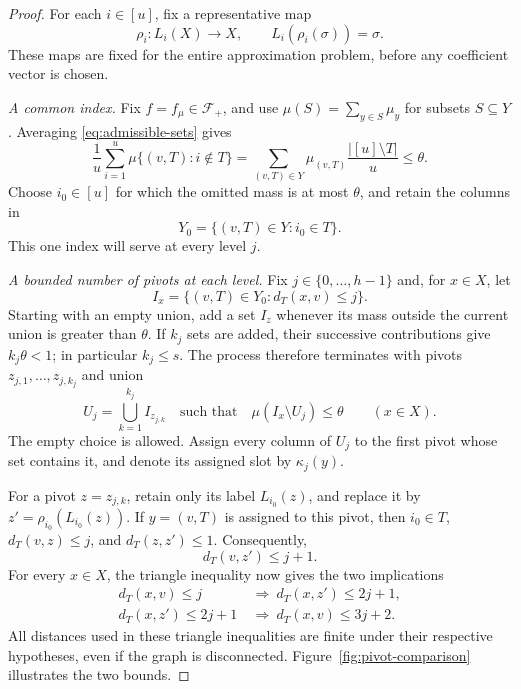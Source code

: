 \begin{proof}
For each $i\in[u]$, fix a representative map
\[
  \rho_i:L_i(X)\longrightarrow X,
  \qquad L_i(\rho_i(\sigma))=\sigma.
\]
These maps are fixed for the entire approximation problem, before any
coefficient vector is chosen.

\emph{A common index.}
Fix $f=f_\mu\in\mathcal F_+$, and use
$\mu(S)=\sum_{y\in S}\mu_y$ for subsets $S\subseteq Y$.  Averaging
\eqref{eq:admissible-sets} gives
\[
  \frac1u\sum_{i=1}^u\mu\{(v,T):i\notin T\}
   =\sum_{(v,T)\in Y}\mu_{(v,T)}\frac{|[u]\setminus T|}{u}
   \le\theta.
\]
Choose $i_0\in[u]$ for which the omitted mass is at most $\theta$, and
retain the columns in
\[
  Y_0=\{(v,T)\in Y:i_0\in T\}.
\]
This one index will serve at every level $j$.

\emph{A bounded number of pivots at each level.}
Fix $j\in\{0,\ldots,h-1\}$ and, for $x\in X$, let
\[
  I_x=\{(v,T)\in Y_0:d_T(x,v)\le j\}.
\]
Starting with an empty union, add a set $I_z$ whenever its mass outside
the current union is greater than $\theta$.  If $k_j$ sets are added,
their successive contributions give $k_j\theta<1$; in particular
$k_j\le s$.  The process therefore terminates with pivots
$z_{j,1},\ldots,z_{j,k_j}$ and union
\[
  U_j=\bigcup_{k=1}^{k_j}I_{z_{j,k}}
  \quad\text{such that}\quad
  \mu(I_x\setminus U_j)\le\theta\qquad(x\in X).
\]
The empty choice is allowed.  Assign every column of $U_j$ to the first
pivot whose set contains it, and denote its assigned slot by
$\kappa_j(y)$.

For a pivot $z=z_{j,k}$, retain only its label $L_{i_0}(z)$, and replace
it by $z'=\rho_{i_0}(L_{i_0}(z))$.  If $y=(v,T)$ is assigned to this
pivot, then $i_0\in T$, $d_T(v,z)\le j$, and $d_T(z,z')\le1$.
Consequently,
\begin{equation}
  d_T(v,z')\le j+1.
  \label{eq:pivot-replacement}
\end{equation}
For every $x\in X$, the triangle inequality now gives the two implications
\begin{align}
  d_T(x,v)\le j
   &\ \Longrightarrow\ d_T(x,z')\le2j+1,
   \label{eq:pivot-forward}\\
  d_T(x,z')\le2j+1
   &\ \Longrightarrow\ d_T(x,v)\le3j+2.
   \label{eq:pivot-backward}
\end{align}
All distances used in these triangle inequalities are finite under their
respective hypotheses, even if the graph is disconnected.
Figure~\ref{fig:pivot-comparison} illustrates the two bounds.




\end{proof}
